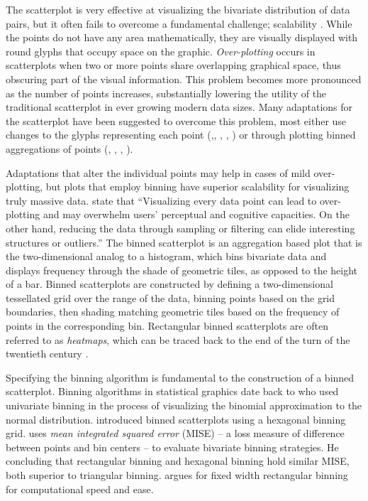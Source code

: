 \documentclass[11pt]{isuthesis}
\begin{document}
The scatterplot is very effective at visualizing the bivariate distribution of data pairs, but it often fails to overcome a fundamental challenge; scalability \citep{Theus2006}. While the points do not have any area mathematically, they are visually displayed with round glyphs that occupy space on the graphic. \textit{Over-plotting} occurs in scatterplots when two or more points share overlapping graphical space, thus obscuring part of the visual information. This problem becomes more pronounced as the number of points increases, substantially lowering the utility of the traditional scatterplot in ever growing modern data sizes. Many adaptations for the scatterplot have been suggested to overcome this problem, most either use changes to the glyphs representing each point (\citealt{tukey},\citealt{few2008solutions}, \citealt{Keim2010GenScatter}, \citealt{Hao2010visual}, \citealt{Janetzko2013Ellipse}) or through plotting binned aggregations of points (\citealt{sunflowerplots}, \citealt{Carr1987}, \citealt{Wickham2013Bin}, \citealt{Liu2013imMens}). 

Adaptations that alter the individual points may help in cases of mild over-plotting, but plots that employ binning have superior scalability for visualizing truly massive data. \citet{Liu2013imMens} state that ``Visualizing every data point can lead to over-plotting and may overwhelm users' perceptual and cognitive capacities. On the other hand, reducing the data through sampling or filtering can elide interesting structures or outliers.'' The binned scatterplot is an aggregation based plot that is the two-dimensional analog to a histogram, which bins bivariate data and displays frequency through the shade of geometric tiles, as opposed to the height of a bar. Binned scatterplots are constructed by defining a two-dimensional tessellated grid over the range of the data, binning points based on the grid boundaries, then shading matching geometric tiles based on the frequency of points in the corresponding bin. Rectangular binned scatterplots are often referred to as \textit{heatmaps}, which can be traced back to the end of the turn of the twentieth century \citep{Wilkinson2000}.

Specifying the binning algorithm is fundamental to the construction of a binned scatterplot. Binning algorithms in statistical graphics date back to \citet{Pearson1895} who used univariate binning in the process of visualizing the binomial approximation to the normal distribution.  \citet{Carr1987} introduced binned scatterplots using a hexagonal binning grid. \citet{scott1992} uses \textit{mean integrated squared error} (MISE) -- a loss measure of difference between points and bin centers -- to evaluate bivariate binning strategies. He concluding that rectangular binning and hexagonal binning hold similar MISE, both superior to triangular binning. \citet{Wickham2013Bin} argues for fixed width rectangular binning for computational speed and ease. 
\end{document}

